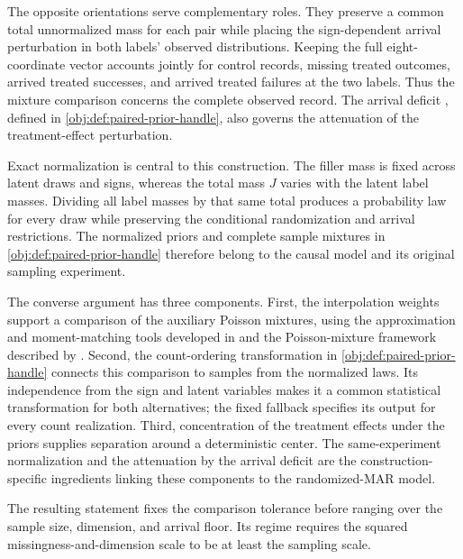 The opposite orientations serve complementary roles. They preserve a common total unnormalized mass for each pair while placing the sign-dependent arrival perturbation in both labels' observed distributions. Keeping the full eight-coordinate vector accounts jointly for control records, missing treated outcomes, arrived treated successes, and arrived treated failures at the two labels. Thus the mixture comparison concerns the complete observed record. The arrival deficit , defined in \cref{obj:def:paired-prior-handle}, also governs the attenuation of the treatment-effect perturbation.

Exact normalization is central to this construction. The filler mass is fixed across latent draws and signs, whereas the total mass \(J\) varies with the latent label masses. Dividing all label masses by that same total produces a probability law for every draw while preserving the conditional randomization and arrival restrictions. The normalized priors  and complete sample mixtures  in \cref{obj:def:paired-prior-handle} therefore belong to the causal model and its original sampling experiment.

The converse argument has three components. First, the interpolation weights support a comparison of the auxiliary Poisson mixtures, using the approximation and moment-matching tools developed in \citet{WuYang2016} and the Poisson-mixture framework described by \citet{Wu2020}. Second, the count-ordering transformation in \cref{obj:def:paired-prior-handle} connects this comparison to samples from the normalized laws. Its independence from the sign and latent variables makes it a common statistical transformation for both alternatives; the fixed fallback specifies its output for every count realization. Third, concentration of the treatment effects under the priors supplies separation around a deterministic center. The same-experiment normalization and the attenuation by the arrival deficit are the construction-specific ingredients linking these components to the randomized-MAR model.

The resulting statement fixes the comparison tolerance  before ranging over the sample size, dimension, and arrival floor. Its regime requires the squared missingness-and-dimension scale to be at least the sampling scale.

